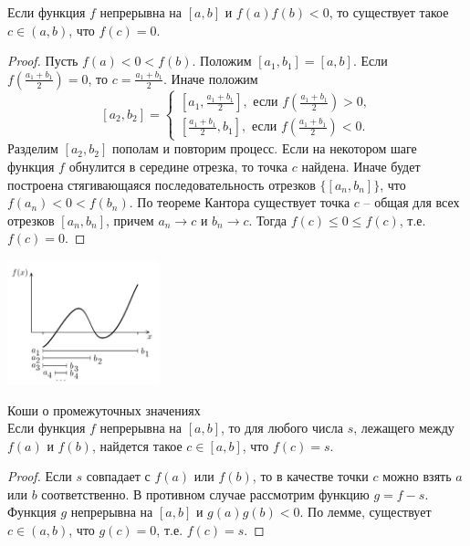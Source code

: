     \begin{lemma}
        Если функция $f$ непрерывна на $[a, b]$ и $f(a)f(b) < 0$, то существует такое $c \in (a, b)$, что $f(c) = 0$.
    \end{lemma}

    \begin{proof}
        Пусть $f(a) < 0 < f(b)$. Положим $[a_{1}, b_{1}] = [a, b]$. Если $f(\frac{a_{1} + b_{1}}{2}) = 0$, то $c = \frac{a_{1} + b_{1}}{2}$. Иначе положим
        \[[a_{2}, b_{2}] = \begin{cases}
            [a_{1}, \frac{a_{1} + b_{1}}{2}], \text{ если } f(\frac{a_{1} + b_{1}}{2}) > 0,\\
            [\frac{a_{1} + b_{1}}{2}, b_{1}], \text{ если } f(\frac{a_{1} + b_{1}}{2}) < 0.
        \end{cases}\]
        Разделим $[a_{2}, b_{2}]$ пополам и повторим процесс. Если на некотором шаге функция $f$ обнулится в середине отрезка, то точка $c$ найдена. Иначе будет построена стягивающаяся последовательность отрезков $\{[a_{n}, b_{n}]\}$, что $f(a_{n}) < 0 < f(b_{n})$. По теореме Кантора существует точка $c$ -- общая для всех отрезков $[a_{n}, b_{n}]$, причем $a_{n} \to c$ и $b_{n} \to c$. Тогда $f(c) \leq 0 \leq f(c)$, т.е. $f(c) = 0$.
    \end{proof}

    \begin{center}
        \includegraphics[width=0.33\textwidth]{none4.png}
    \end{center}

    \begin{theorem}{Коши о промежуточных значениях}\\
        Если функция $f$ непрерывна на $[a, b]$, то для любого числа $s$, лежащего между $f(a)$ и $f(b)$, найдется такое $c \in [a, b]$, что $f(c) = s$.
    \end{theorem}

    \begin{proof}
        Если $s$ совпадает с $f(a)$ или $f(b)$, то в качестве точки $c$ можно взять $a$ или $b$ соответственно. В противном случае рассмотрим функцию $g = f - s$. Функция $g$ непрерывна на $[a, b]$ и $g(a)g(b) < 0$. По лемме, существует $c \in (a, b)$, что $g(c) = 0$, т.е. $f(c) = s$.
    \end{proof}

